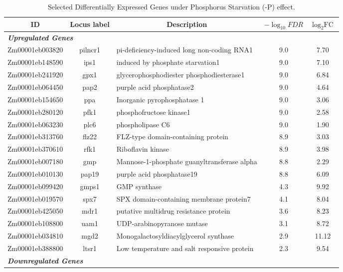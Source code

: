 \documentclass[9pt,twocolumn,twoside]{rilabRxiv}
\begin{document}
\begin{table}[h!]
\centering
\footnotesize %
\caption{Selected Differentially Expressed Genes under Phosphorus Starvation ($\text{-P}$) effect.}
\label{table::phosphorusDEGs}
\begin{tabular}{ccp{7.5cm}cc} %
\hline
\textbf{ID} & \textbf{Locus label} & \multicolumn{1}{c}{\textbf{Description}} &   \textbf{$-\log_{10}{\textit{FDR}}$} & \textbf{$\log_2{\text{FC}}$}\\
\hline
\multicolumn{5}{l}{\textit{\textbf{Upregulated Genes}}} \\
\hline
Zm00001eb003820 & pilncr1 & pi-deficiency-induced long non-coding RNA1 & 9.0 & 7.70\\
Zm00001eb148590 & ips1 & induced by phosphate starvation1 & 9.0 & 7.10\\
Zm00001eb241920 & gpx1 & glycerophosphodiester phosphodiesterase1 & 9.0 & 6.84\\
Zm00001eb064450 & pap2 & purple acid phosphatase2 & 9.0 & 4.64\\
Zm00001eb154650 & ppa & Inorganic pyrophosphatase 1 & 9.0 & 3.06\\
Zm00001eb280120 & pfk1 & phosphofructose kinase1 & 9.0 & 2.58\\
Zm00001eb063230 & plc6 & phospholipase C6 & 9.0 & 1.90\\
Zm00001eb313760 & flz22 & FLZ-type domain-containing protein & 8.9 & 3.03\\
Zm00001eb370610 & rfk1 & Riboflavin kinase & 8.9 & 3.98\\
Zm00001eb007180 & gmp & Mannose-1-phosphate guanyltransferase alpha & 8.8 & 2.29\\
Zm00001eb010130 & pap19 & purple acid phosphatase19 & 8.8 & 6.09\\
Zm00001eb099420 & gmps1 & GMP synthase & 4.3 & 9.92\\
Zm00001eb019570 & spx7 & SPX domain-containing membrane protein7 & 4.1 & 8.04\\
Zm00001eb425050 & mdr1 & putative multidrug resistance protein & 3.6 & 8.23\\
Zm00001eb108800 & uam1 & UDP-arabinopyranose mutase & 3.1 & 8.72\\
Zm00001eb034810 & mgd2 & Monogalactosyldiacylglycerol synthase & 2.9 & 11.12\\
Zm00001eb388800 & ltsr1 & Low temperature and salt responsive protein & 2.3 & 9.54\\
\hline
\multicolumn{5}{l}{\textit{\textbf{Downregulated Genes}}} \\

\end{tabular}
\end{table}
\end{document}

